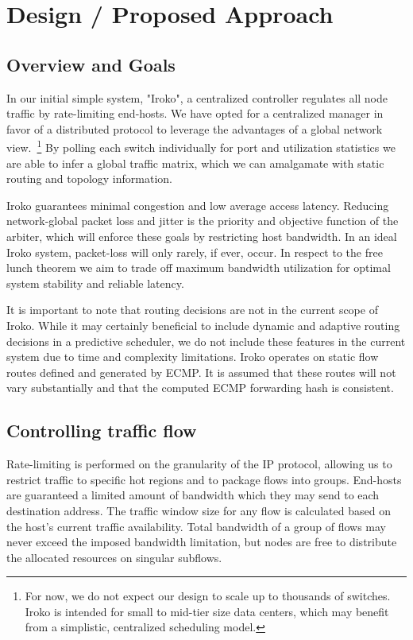 

\section{Design / Proposed Approach}
\label{sec:design}

\subsection{Overview and Goals}
In our initial simple system, "Iroko", a centralized controller regulates all 
node traffic by rate-limiting end-hosts. We have opted for a centralized 
manager in favor of a distributed protocol to leverage the advantages of a 
global network view.~\footnote{For now, we do not expect our design to scale up 
to thousands of switches. Iroko is intended for small to mid-tier size data 
centers, which may benefit from a simplistic, centralized scheduling model.}
By polling each switch individually for port and utilization statistics we are 
able to infer a global traffic matrix, which we can amalgamate with static 
routing and topology information. 

Iroko guarantees minimal congestion and low average access latency. Reducing 
network-global packet loss and jitter is the priority and objective function of 
the arbiter, which will enforce these goals by restricting host bandwidth. In 
an ideal Iroko system, packet-loss will only rarely, if ever, occur. In respect 
to the free lunch theorem we aim to trade off maximum bandwidth utilization for 
optimal system stability and reliable latency.

It is important to note that routing decisions are not in the current scope of 
Iroko. While it may certainly beneficial to include dynamic and adaptive 
routing decisions in a predictive scheduler, we do not include these features 
in the current system due to time and complexity limitations. Iroko operates on 
static flow routes defined and generated by ECMP. It is assumed that these 
routes will not vary substantially and that the computed ECMP forwarding hash 
is consistent.


\subsection{Controlling traffic flow}
Rate-limiting is performed on the granularity of the IP protocol, allowing us 
to restrict traffic to specific hot regions and to package flows into groups.
End-hosts are guaranteed a limited amount of bandwidth which they may send to 
each destination address. The traffic window size for any flow is calculated 
based on the host's current traffic availability. Total bandwidth of a group of 
flows may never exceed the imposed bandwidth limitation, but nodes are free to 
distribute the allocated resources on singular subflows.

